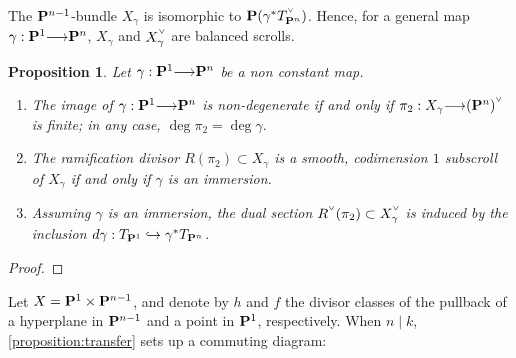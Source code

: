 \documentclass[11pt,reqno]{amsart}
\theoremstyle{plain}
\newtheorem{proposition}[theorem]{Proposition}
\theoremstyle{definition}
\theoremstyle{remark}
\numberwithin{equation}{section}
\newcommand{\todo}[1]{\fbox{ToDo: #1}}
\renewcommand{\to}{{\longrightarrow}}
\numberwithin{equation}{section}
\newcommand{\smvee}{\raise0.5ex\hbox{$\scriptscriptstyle\vee$}}
\begin{document}
\begin{remark}
  The $\P^{n-1}$-bundle $X_{\gamma}$ is isomorphic to $\P(\gamma^{*}T^{\smvee}_{\P^{n}})$. Hence, for a general map $\gamma: \P^{1} \to \P^{n}$, $X_{\gamma}$ and $X_{\gamma}^{\smvee}$ are balanced scrolls.
\end{remark}

\begin{proposition}\label{proposition:transfer}
 Let $\gamma: \P^{1} \to \P^{n}$ be a non constant map.

 \begin{enumerate} 
  \item The image of $\gamma: \P^{1} \to \P^{n}$ is non-degenerate if and only if $\pi_{2} : X_{\gamma} \to (\P^{n})^{\smvee}$ is finite; in any case,  $\deg \pi_{2} = \deg \gamma.$ 
  \item The ramification divisor $R(\pi_{2}) \subset X_{\gamma}$ is a smooth, codimension $1$ subscroll of $X_{\gamma}$ if and only if $\gamma$ is an immersion. 
  \item Assuming $\gamma$ is an immersion, the dual section $R^{\smvee}(\pi_{2}) \subset X^{\smvee}_{\gamma}$ is induced by the inclusion $d \gamma: T_{\P^{1}} \hookrightarrow \gamma^{*}T_{\P^{n}}$.
\end{enumerate}
\end{proposition}

\begin{proof}
  \todo{PROVE}
\end{proof}

Let $X = \P^{1} \times \P^{n-1}$, and denote by $h$ and $f$ the divisor classes of the pullback of a hyperplane in $\P^{n-1}$ and a point in $\P^{1}$, respectively.  When $n \mid k$,  \autoref{proposition:transfer} sets up a commuting diagram: 

\begin{center}
\end{center}
\end{document}
